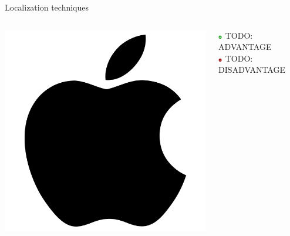 \documentclass[11pt]{beamer}
\begin{document}
\begin{frame}[t]{Localization techniques}

  \begin{columns}[c]

    \begin{column}{0.17\textwidth}
      \includegraphics[width=\textwidth]{apple}
    \end{column}

    \hfill

    \begin{column}{0.8\textwidth}

      \includegraphics[width=0.05\textwidth]{plus} TODO: ADVANTAGE\\
      \includegraphics[width=0.05\textwidth]{minus} TODO: DISADVANTAGE

    \end{column}

  \end{columns}


\end{frame}
\end{document}
